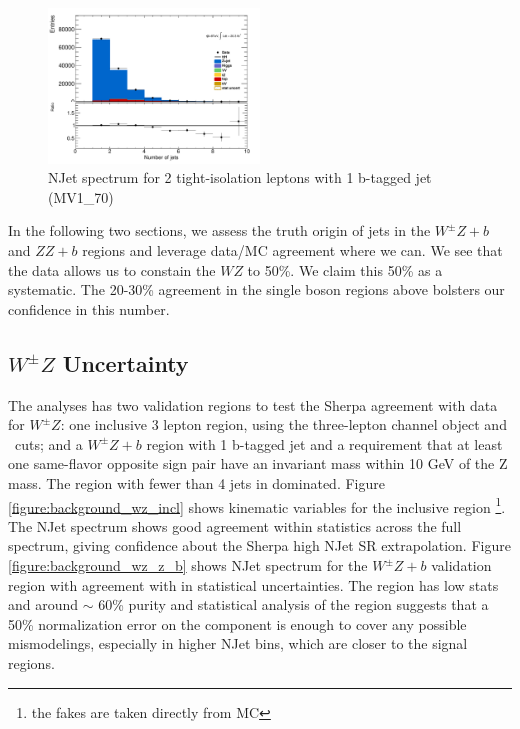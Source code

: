 \begin{figure}[!htbp]
\centering \includegraphics[width=0.5\textwidth]{figs/wz/ZbVR}
\caption{NJet spectrum for 2 tight-isolation leptons with 1 b-tagged jet (MV1\_70)} 
\label{figure:background_wz_zb}
\end{figure} 

In the following two sections, we assess the truth origin of jets in the $W^{\pm}Z+b$ and $ZZ+b$ regions and leverage data/MC agreement where we can. We see that the data allows us to constain the $WZ$ to 50\%. We claim this 50\% as a systematic. The 20-30\% agreement in the single boson regions above bolsters our confidence in this number. 

\subsection{$W^{\pm}Z$ Uncertainty} 
The \tth analyses has two validation regions to test the Sherpa agreement with data for $W^{\pm}Z$: one inclusive 3 lepton region, using the three-lepton channel object and \pt\ cuts; and a $W^{\pm}Z+b$ region with 1 b-tagged jet and a requirement that at least one same-flavor opposite sign pair have an invariant mass within 10 GeV of the Z mass. The region with fewer than 4 jets in \WZ dominated. Figure \ref{figure:background_wz_incl} shows kinematic variables for the inclusive region \footnote{the fakes are taken directly from MC}. The NJet spectrum shows good agreement within statistics across the full spectrum, giving confidence about the Sherpa high NJet SR extrapolation. Figure \ref{figure:background_wz_z_b} shows NJet spectrum for the $W^{\pm}Z+b$ validation region with agreement with in statistical uncertainties. The region has low stats and around $\sim$ 60\% purity and statistical analysis of the region suggests that a 50\% normalization error on the \WZ component is enough to cover any possible mismodelings, especially in higher NJet bins, which are closer to the signal regions.  

